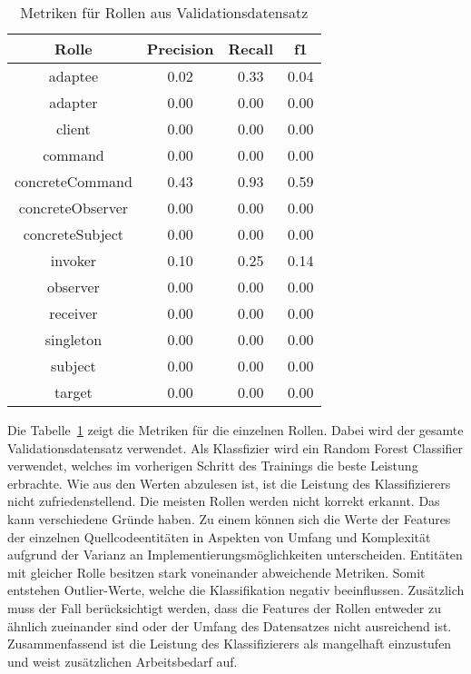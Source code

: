 \begin{table}[H]
    \caption{Metriken für Rollen aus Validationsdatensatz}
    \label{tab:classifier_metrics}
    \begin{tabular}{|c|c|c|c|}
        \hline
         Rolle & Precision & Recall & f1\\
        \hline
        adaptee & 0.02 & 0.33 & 0.04\\adapter & 0.00 & 0.00 & 0.00\\client & 0.00 & 0.00 & 0.00\\command & 0.00 & 0.00 & 0.00\\concreteCommand & 0.43 & 0.93 & 0.59\\concreteObserver & 0.00 & 0.00 & 0.00\\concreteSubject & 0.00 & 0.00 & 0.00\\invoker & 0.10 & 0.25 & 0.14\\observer & 0.00 & 0.00 & 0.00\\receiver & 0.00 & 0.00 & 0.00\\singleton & 0.00 & 0.00 & 0.00\\subject & 0.00 & 0.00 & 0.00\\target & 0.00 & 0.00 & 0.00\\
        \hline
        \end{tabular}
\end{table}

Die Tabelle~\ref{tab:classifier_metrics} zeigt die Metriken für die einzelnen Rollen. Dabei wird der gesamte Validationsdatensatz verwendet.
Als Klassfizier wird ein Random Forest Classifier verwendet, welches im vorherigen Schritt des Trainings die beste Leistung erbrachte. Wie aus den Werten abzulesen ist, ist die Leistung des Klassifizierers nicht zufriedenstellend. Die meisten Rollen werden nicht korrekt erkannt.  Das kann verschiedene Gründe haben.
Zu einem können sich die Werte der Features der einzelnen Quellcodeentitäten in Aspekten von Umfang und Komplexität aufgrund der Varianz an Implementierungsmöglichkeiten unterscheiden. Entitäten mit gleicher Rolle besitzen stark voneinander abweichende Metriken. Somit entstehen Outlier-Werte, welche die Klassifikation negativ beeinflussen.
Zusätzlich muss der Fall berücksichtigt werden, dass die Features der Rollen entweder zu ähnlich zueinander sind oder der Umfang des Datensatzes nicht ausreichend ist.
Zusammenfassend ist die Leistung des Klassifizierers als mangelhaft einzustufen und weist zusätzlichen Arbeitsbedarf auf.












